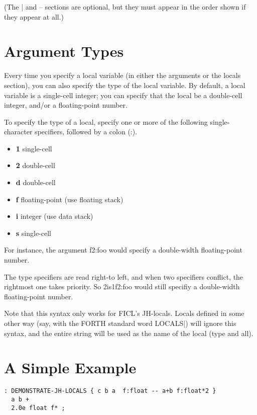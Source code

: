 (The | and -- sections are optional, but they must appear in the order
shown if they appear at all.)


\section{Argument Types}
Every time you specify a local variable (in either the arguments or the
locals section), you can also specify the type of the local variable.
By default, a local variable is a single-cell integer; you can specify
that the local be a double-cell integer, and/or a floating-point number.

To specify the type of a local, specify one or more of the following
single-character specifiers, followed by a colon (:).
\begin{itemize}[noitemsep]
	\item \textbf{1} single-cell
	\item \textbf{2} double-cell
	\item \textbf{d} double-cell
	\item \textbf{f} floating-point (use floating stack)
	\item \textbf{i} integer (use data stack)
	\item \textbf{s} single-cell
\end{itemize}
For instance, the argument f2:foo would specify a double-width
floating-point number.

The type specifiers are read right-to left, and when two specifiers
conflict, the rightmost one takes priority. So 2is1f2:foo would still
specifiy a double-width floating-point number.

Note that this syntax only works for FICL's JH-locals. Locals defined in
some other way (say, with the FORTH standard word LOCALS|) will ignore
this syntax, and the entire string will be used as the name of the local
(type and all).


\section{A Simple Example}
\begin{lstlisting}[frame=single]
: DEMONSTRATE-JH-LOCALS { c b a  f:float -- a+b f:float*2 }
  a b +
  2.0e float f* ;
\end{lstlisting}
